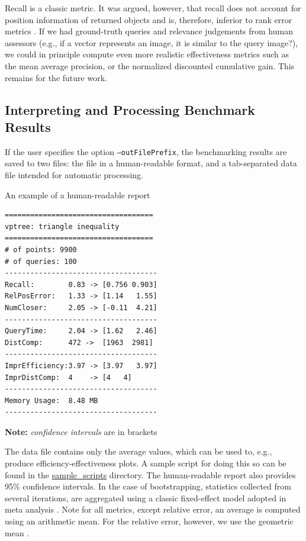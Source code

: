 \documentclass[runningheads,a4paper]{llncs}
\newcommand{\ttt}[1]{\texttt{#1}}
\begin{document}
{Recall is a classic metric. 
It was argued, however, 
that recall does not account for position information of returned objects
and is, therefore, inferior to rank error metrics \cite{Amato_et_al:2003,Cayton:2008}.
If we had ground-truth queries and relevance judgements from human assessors (e.g.,
if a vector represents an image, it is similar to the query image?),
we could in principle compute even more realistic effectiveness metrics 
such as the mean average precision,
or the normalized discounted cumulative gain.
This remains for the future work.

\subsection{Interpreting and Processing Benchmark Results}
If the user specifies the option \ttt{--outFilePrefix},
the benchmarking results are saved to two files:
the file in a human-readable format,
and a tab-separated data file intended for automatic processing.

\begin{table}
\caption{An example of a human-readable report 
\label{TableHRep}}
\begin{verbatim}
===================================
vptree: triangle inequality
===================================
# of points: 9900
# of queries: 100
------------------------------------
Recall:        0.83 -> [0.756 0.903]
RelPosError:   1.33 -> [1.14   1.55]
NumCloser:     2.05 -> [-0.11  4.21]
------------------------------------
QueryTime:     2.04 -> [1.62   2.46]
DistComp:      472 ->  [1963  2981]
------------------------------------
ImprEfficiency:3.97 -> [3.97   3.97]
ImprDistComp:  4    -> [4   4]
------------------------------------
Memory Usage:  8.48 MB
------------------------------------
\end{verbatim}
\textbf{Note:} \emph{confidence intervals} are in brackets
\vspace{-4em}
\end{table}

The data file contains only the average values,
which can be used to, e.g., produce efficiency-effectiveness plots.
A sample script for doing this so can be found in the \href{https://github.com/searchivarius/NonMetricSpaceLib/blob/master/sample_scripts/nips2013/figures/all.sh}{sample\_scripts} directory.
The human-readable report also provides 95\% confidence intervals.
In the case of bootstrapping, statistics collected from several iterations,
are aggregated using a classic fixed-effect model adopted in meta analysis \cite{Hedges_and_Vevea:1998}.
Note for all metrics, except relative error, an average is computed using an arithmetic mean.
For the relative error, however, we use the geometric mean  \cite{king:1986}.

}
\end{document}
